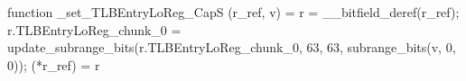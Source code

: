 function _set_TLBEntryLoReg_CapS (r_ref, v) = {
    r = __bitfield_deref(r_ref);
    r.TLBEntryLoReg_chunk_0 = update_subrange_bits(r.TLBEntryLoReg_chunk_0, 63, 63, subrange_bits(v, 0, 0));
    (*r_ref) = r
}
